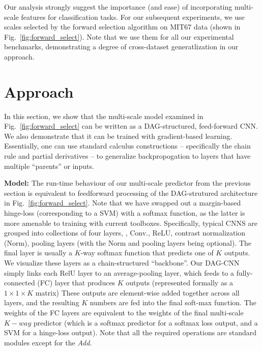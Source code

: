 \documentclass[10pt,twocolumn,letterpaper]{article}
\begin{document}
Our analysis strongly suggest the importance (and ease) of incorporating multi-scale features for classification tasks. For our subsequent experiments, we use scales selected by the forward selection algorithm on MIT67 data (shown in Fig.~\ref{fig:forward_select}). Note that we use them for all our experimental benchmarks, demonstrating a degree of cross-dataset generatlization in our approach.

\section{Approach} 

In this section, we show that the multi-scale model examined in Fig.~\ref{fig:forward_select} can be written as a DAG-structured, feed-forward CNN. We also demonstrate that it can be trained with gradient-based learning. Essentially, one can use standard calculus constructions -- specifically the chain rule and partial derivatives -- to generalize backpropogation to layers that have multiple ``parents'' or inputs.

{\bf Model:} The run-time behaviour of our multi-scale predictor from the previous section is equivalent to feedforward processing of the DAG-strutured architecture in Fig.~\ref{fig:forward_select}. Note that we have swapped out a margin-based hinge-loss (corresponding to a SVM) with a softmax function, as the latter is more amenable to training with current toolboxes. Specifically, typical CNNS are grouped into collections of four layers, \ie, Conv., ReLU, contrast normalization (Norm), pooling layers (with the Norm and pooling layers being optional). The final layer is usually a $K$-way softmax function that predicts one of $K$ outputs. We visualize these layers as a chain-structured ``backbone''. Our DAG-CNN simply links each RelU layer to an average-pooling layer, which feeds to a fully-connected (FC) layer that produces $K$ outputs (represented formally as a $1 \times 1 \times K$ matrix) These outputs are element-wise added together across all layers, and the resulting $K$ numbers are fed into the final soft-max function. The weights of the FC layers are equivalent to the weights of the final multi-scale $K-way$ predictor (which is a softmax predictor for a softmax loss output, and a SVM for a hinge-loss output). Note that all the required operations are standard modules except for the \textit{Add}.

\end{document}
